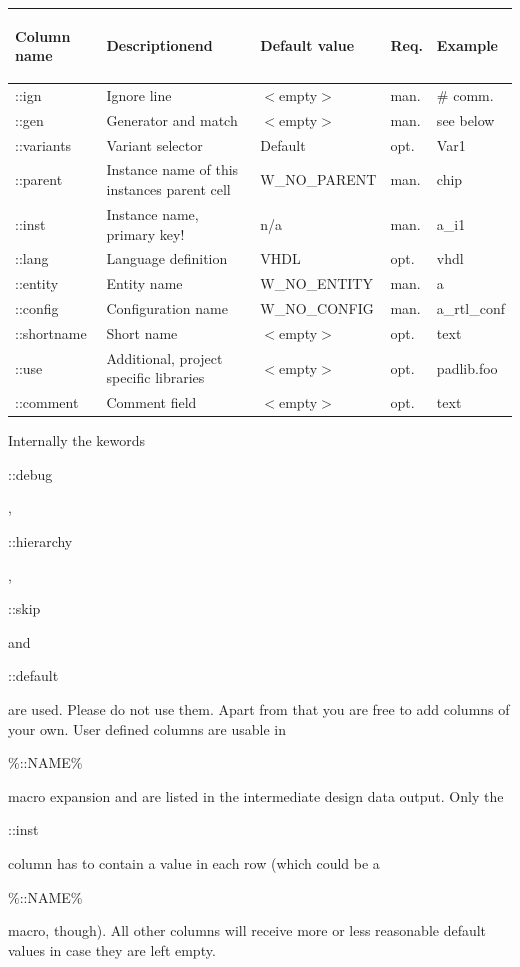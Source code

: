 \documentclass[a4paper,12pt]{article}
\begin{document}
\begin{table}[htb]\begin{tabular}{|l|p{4cm}|p{4cm}|p{15mm}|p{2cm}|}\hline
\begin{bf}Column name\end{bf} & \begin{bf}Descriptionend\end{bf} & \begin{bf}Default value\end{bf} & \begin{bf}Req.\end{bf} & \begin{bf}Example\end{bf}\\\hline
::ign & Ignore line & $<$empty$>$ & man. & \# comm. \\\hline
::gen &  Generator and match & $<$empty$>$ & man. & see below \\\hline
::variants & Variant selector & Default & opt. & Var1\\\hline
::parent & Instance name of this instances parent cell & W\_NO\_PARENT & man. & chip \\\hline
::inst & Instance name, primary key! & n/a & man. & a\_i1\\\hline
::lang & Language definition & VHDL & opt. & vhdl \\\hline
::entity & Entity name & W\_NO\_ENTITY & man. & a \\\hline
::config & Configuration name & W\_NO\_CONFIG & man. & a\_rtl\_conf \\\hline
::shortname & Short name & $<$empty$>$ & opt. & text \\\hline
::use & Additional, project specific libraries & $<$empty$>$ & opt. & padlib.foo \\\hline
::comment & Comment field & $<$empty$>$ & opt. & text \\\hline
\end{tabular}\end{table}

Internally the kewords \begin{tt}::debug\end{tt}, \begin{tt}::hierarchy\end{tt}, \begin{tt}::skip\end{tt} and \begin{tt}::default\end{tt} are used. Please do not use them. Apart from that you are free to add columns of your own. User defined columns are usable in \begin{tt}\%::NAME\%\end{tt} macro expansion and are listed in the intermediate design data output.\newline
Only the \begin{tt}::inst\end{tt} column has to contain a value in each row (which could be a \begin{tt}\%::NAME\%\end{tt} macro, though). All other columns will receive more or less reasonable default values in case they are left empty.
\end{document}
